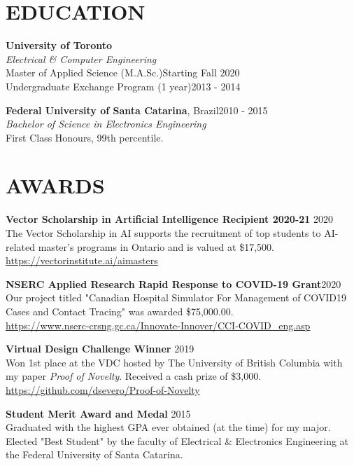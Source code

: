 \documentclass[margin, line]{res}
\begin{document}
\address{\textbf{For more information}: \url{https://dsevero.com}}
\begin{resume}

\section{EDUCATION}
\textbf{University of Toronto}\\
{\sl Electrical \& Computer Engineering}\\
Master of Applied Science (M.A.Sc.)\hfill Starting Fall 2020\\
Undergraduate Exchange Program (1 year)\hfill 2013 - 2014

\textbf{Federal University of Santa Catarina}, Brazil\hfill 2010 - 2015 \\
{\sl Bachelor of Science in Electronics Engineering}\\
First Class Honours, 99th percentile.

\section{AWARDS}
\textbf{Vector Scholarship in Artificial Intelligence Recipient 2020-21} \hfill 2020\\
The Vector Scholarship in AI supports the recruitment of top students to AI-related master’s programs in Ontario and is valued at \$17,500.\\
\url{https://vectorinstitute.ai/aimasters}

\textbf{NSERC Applied Research Rapid Response to COVID-19 Grant}\hfill 2020\\
Our project titled "Canadian Hospital Simulator For Management of COVID19 Cases and Contact Tracing" was awarded \$75,000.00.\\
\url{https://www.nserc-crsng.gc.ca/Innovate-Innover/CCI-COVID_eng.asp}

\textbf{Virtual Design Challenge Winner} \hfill 2019\\
Won 1st place at the VDC hosted by The University of British Columbia with my paper \emph{Proof of Novelty}. Received a cash prize of \$3,000.\\
\url{https://github.com/dsevero/Proof-of-Novelty}

\textbf{Student Merit Award and Medal} \hfill 2015\\
Graduated with the highest GPA ever obtained (at the time) for my major. Elected "Best Student" by the faculty of Electrical \& Electronics Engineering at the Federal University of Santa Catarina.


\end{resume}
\end{document}
